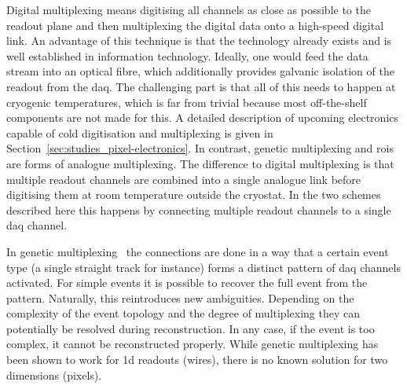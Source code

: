 Digital multiplexing means digitising all channels as close as possible to the readout plane and then multiplexing the digital data onto a high-speed digital link.
An advantage of this technique is that the technology already exists and is well established in information technology.
Ideally, one would feed the data stream into an optical fibre, which additionally provides galvanic isolation of the readout from the \gls{daq}.
The challenging part is that all of this needs to happen at cryogenic temperatures, which is far from trivial because most off-the-shelf components are not made for this.
A detailed description of upcoming electronics capable of cold digitisation and multiplexing is given in Section~\ref{sec:studies_pixel-electronics}.
In contrast, genetic multiplexing and \glspl{roi} are forms of analogue multiplexing.
The difference to digital multiplexing is that multiple readout channels are combined into a single analogue link before digitising them at room temperature outside the cryostat.
In the two schemes described here this happens by connecting multiple readout channels to a single \gls{daq} channel.

In genetic multiplexing~\cite{gen_mux} the connections are done in a way that a certain event type (a single straight track for instance) forms a distinct pattern of \gls{daq} channels activated.
For simple events it is possible to recover the full event from the pattern.
Naturally, this reintroduces new ambiguities.
Depending on the complexity of the event topology and the degree of multiplexing they can potentially be resolved during reconstruction.
In any case, if the event is too complex, it cannot be reconstructed properly.
While genetic multiplexing has been shown to work for \gls{1d} readouts (wires), there is no known solution for two dimensions (pixels).


